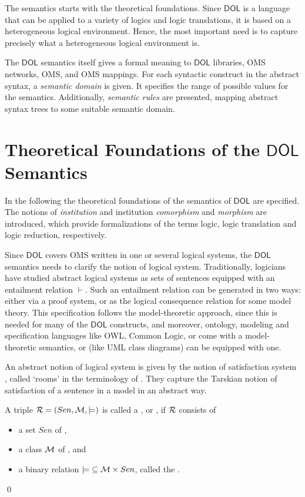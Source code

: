 \documentclass[10pt,fleqn,final]{scrreprt}
\newcommand*{\termref}[1]{\index{#1}#1\xspace}
\newcommand*{\syntax}[1]{\texttt{#1}}
\newcommand*{\DOL}{\ensuremath{\mathsf{DOL}}\xspace}
\newcommand{\sclause}[1]{\section{#1}}
\newenvironment{definitions}[0]{\medskip }{}
\begin{document}
\begin{definitions}
The semantics starts with the theoretical foundations. Since \DOL is a
language that can be applied to a variety of logics and logic
translations, it is based on a heterogeneous logical environment.
Hence, the most important need is to capture precisely what a
heterogeneous logical environment is.

The \DOL semantics itself gives a formal meaning to \DOL libraries, OMS
networks, OMS, and OMS mappings. For each syntactic construct
in the abstract syntax,
a \emph{semantic domain} is given. It specifies the range of possible
values for the semantics. Additionally, \emph{semantic rules} are
presented, mapping abstract syntax trees to some suitable semantic
domain.

\sclause{Theoretical Foundations of the \DOL Semantics}
\label{s:foundations}

 In the following the theoretical foundations of the semantics of \DOL are  specified.
The notions of \emph{institution} and institution 
\emph{comorphism} and \emph{morphism} are introduced, which provide formalizations of the terms 
\termref{logic}, \termref{logic translation} and \termref{logic reduction}, respectively. 

Since \DOL covers OMS written in one or several logical systems, the
\DOL semantics needs to clarify the notion of logical
system. Traditionally, logicians have studied abstract logical systems
as sets of sentences equipped with an entailment relation
$\vdash$. Such an entailment relation can be generated in two ways:
either via a proof system, or as the logical consequence relation for
some model theory.  This specification follows the model-theoretic approach, since
this is needed for many of the \DOL constructs, and moreover, ontology,
modeling and specification languages like OWL, Common Logic, or \CASL
come with a model-theoretic semantics, or (like UML class diagrams)
can be equipped with one.

 An abstract notion of logical system is given by  the notion of
satisfaction system \cite{carnielli2008analysis}, called `rooms' in
the terminology of \cite{CharPar}. They capture the Tarskian notion of
satisfaction of a sentence in a model in an abstract way.

\begin{definition}\label{def:room}
A triple ${\cal R}=(Sen,{{\cal M},\models)}$  is called a  , or , if ${\cal R}$  consists of
\begin{itemize}
\item a set $Sen$ of ,
\item a class
${\cal M}$ of , and
\item a binary relation
${\models}\subseteq {\cal M} \times Sen$, called the .
\end{itemize}\qed
\end{definition}


\end{definitions}
\end{document}
